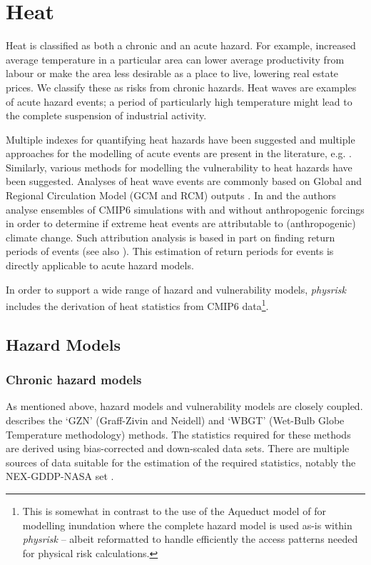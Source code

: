 \documentclass[a4paper,11pt]{extarticle} %
\theoremstyle{definition}
\begin{document}
\section{Heat}

Heat is classified as both a chronic and an acute hazard.  For example, increased average temperature in a particular area can lower average productivity from labour or make the area less desirable as a place to live, lowering real estate prices. We classify these as risks from chronic hazards. Heat waves are examples of acute hazard events; a period of particularly high temperature might lead to the complete suspension of industrial activity.

Multiple indexes for quantifying heat hazards have been suggested and multiple approaches for the modelling of acute events are present in the literature, e.g. \cite{MazdiyasniEtAl:2019}. Similarly, various methods for modelling the vulnerability to heat hazards have been suggested. Analyses of heat wave events are commonly based on Global and Regional Circulation Model (GCM and RCM) outputs \cite{DosioEtAl:2018}. In \cite{Christidis:2021} and \cite{Christidis:2013} the authors analyse ensembles of CMIP6 simulations with and without anthropogenic forcings in order to determine if extreme heat events are attributable to (anthropogenic) climate change. Such attribution analysis is based in part on finding return periods of events (see also \cite{StottEtAl:2016}). This estimation of return periods for events is directly applicable to acute hazard models.

In order to support a wide range of hazard and vulnerability models,  \emph{physrisk} includes the derivation of heat statistics from CMIP6 data\footnote{This is somewhat in contrast to the use of the Aqueduct model of \cite{WardEtAl:2020} for modelling inundation where the complete hazard model is used as-is within \emph{physrisk} -- albeit reformatted to handle efficiently the access patterns needed for physical risk calculations.}.

\subsection{Hazard Models}

\subsubsection{Chronic hazard models}
As mentioned above, hazard models and vulnerability models are closely coupled. \cite{ZhangAndShindell:2021} describes the `GZN' (Graff-Zivin and Neidell) and `WBGT' (Wet-Bulb Globe Temperature methodology) methods. The statistics required for these methods are derived using bias-corrected and down-scaled data sets. There are multiple sources of data suitable for the estimation of the required statistics, notably the NEX-GDDP-NASA set \cite{ThrasherEtAl:2022}.
\end{document}
